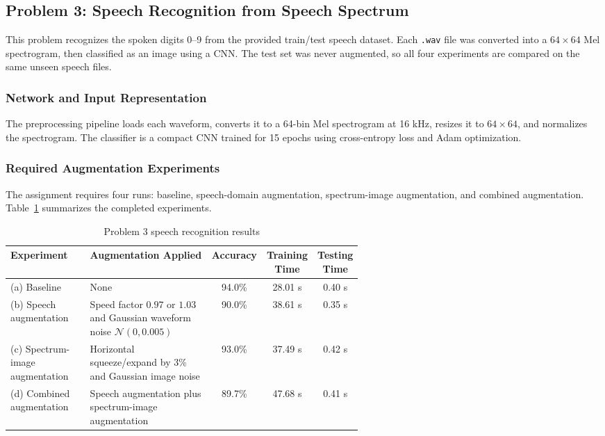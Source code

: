 \subsection{Problem 3: Speech Recognition from Speech Spectrum}

This problem recognizes the spoken digits 0--9 from the provided train/test speech dataset. Each \texttt{.wav} file was converted into a $64 \times 64$ Mel spectrogram, then classified as an image using a CNN. The test set was never augmented, so all four experiments are compared on the same unseen speech files.

\subsubsection{Network and Input Representation}
The preprocessing pipeline loads each waveform, converts it to a 64-bin Mel spectrogram at 16 kHz, resizes it to $64 \times 64$, and normalizes the spectrogram. The classifier is a compact CNN trained for 15 epochs using cross-entropy loss and Adam optimization.

\subsubsection{Required Augmentation Experiments}
The assignment requires four runs: baseline, speech-domain augmentation, spectrum-image augmentation, and combined augmentation. Table~\ref{tab:prob3_results} summarizes the completed experiments.

\begin{table}[H]
    \centering
    \caption{Problem 3 speech recognition results}
    \label{tab:prob3_results}
    \begin{tabular}{|p{0.23\linewidth}|p{0.36\linewidth}|c|c|c|}
        \hline
        \textbf{Experiment} & \textbf{Augmentation Applied} & \textbf{Accuracy} & \textbf{Training Time} & \textbf{Testing Time} \\
        \hline
        (a) Baseline & None & 94.0\% & 28.01 s & 0.40 s \\
        \hline
        (b) Speech augmentation & Speed factor $0.97$ or $1.03$ and Gaussian waveform noise $\mathcal{N}(0,0.005)$ & 90.0\% & 38.61 s & 0.35 s \\
        \hline
        (c) Spectrum-image augmentation & Horizontal squeeze/expand by 3\% and Gaussian image noise & 93.0\% & 37.49 s & 0.42 s \\
        \hline
        (d) Combined augmentation & Speech augmentation plus spectrum-image augmentation & 89.7\% & 47.68 s & 0.41 s \\
        \hline
    \end{tabular}
\end{table}


